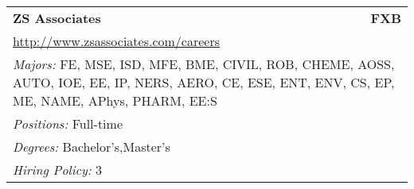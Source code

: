 \documentclass[twoside]{article}
\begin{document}
\begin{center}
\begin{multicols}{3}
\begin{FlushLeft}
\begin{minipage}{\columnwidth}
\end{minipage}
 
\begin{minipage}{\columnwidth}\begin{tabularx}{.95\columnwidth}{Xr}
                 {\Large\bf ZS Associates} & {\Large\bf FXB}\\
    \multicolumn{2}{p{.95\columnwidth}}{\url{http://www.zsassociates.com/careers}}\\
    \multicolumn{2}{p{.95\columnwidth}}{\emph{Majors:} FE, MSE, ISD, MFE, BME, CIVIL, ROB, CHEME, AOSS, AUTO, IOE, EE, IP, NERS, AERO, CE, ESE, ENT, ENV, CS, EP, ME, NAME, APhys, PHARM, EE:S}\\
    \multicolumn{2}{p{.95\columnwidth}}{\emph{Positions:} Full-time}\\
    \multicolumn{2}{p{.95\columnwidth}}{\emph{Degrees:} Bachelor's,Master's}\\
    \multicolumn{2}{p{.95\columnwidth}}{\emph{Hiring Policy:} 3}\\
    \end{tabularx}
    
\end{minipage}
 
\end{FlushLeft}
    \end{multicols}\end{center}
    \newpage{}
\end{document}
